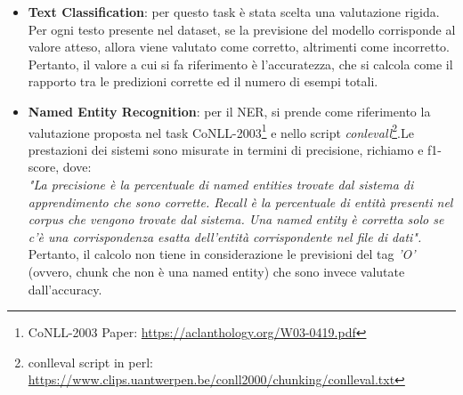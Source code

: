 \begin{itemize}
    \item \textbf{Text Classification}: per questo task è stata scelta una valutazione rigida. Per ogni testo presente nel dataset, se la previsione del modello corrisponde al valore atteso, allora viene valutato come corretto, altrimenti come incorretto. Pertanto, il valore a cui si fa riferimento è l'accuratezza, che si calcola come il rapporto tra le predizioni corrette ed il numero di esempi totali.
    
    \item \textbf{Named Entity Recognition}: per il NER, si prende come riferimento la valutazione proposta nel task CoNLL-2003\footnote{CoNLL-2003 Paper: \href{https://aclanthology.org/W03-0419.pdf}{https://aclanthology.org/W03-0419.pdf}} e nello script \textit{conlevall}\footnote{conlleval script in perl: \href{https://www.clips.uantwerpen.be/conll2000/chunking/conlleval.txt}{https://www.clips.uantwerpen.be/conll2000/chunking/conlleval.txt}}.Le prestazioni dei sistemi sono misurate in termini di precisione, richiamo e f1-score, dove:\\
    \textit{"La precisione è la percentuale di named entities trovate dal sistema di apprendimento che sono corrette. Recall è la percentuale di entità presenti nel corpus che vengono trovate dal sistema. Una named entity è corretta solo se c'è una corrispondenza esatta dell'entità corrispondente nel file di dati".}\\
    Pertanto, il calcolo non tiene in considerazione le previsioni del tag \textit{'O'} (ovvero, chunk che non è una named entity) che sono invece valutate dall'accuracy.
\end{itemize}